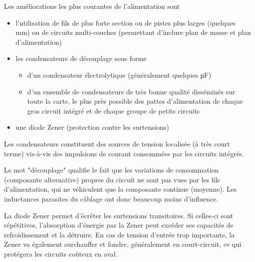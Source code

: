Les améliorations les plus courantes de l'alimentation sont
\begin{itemize}
\item l'utilisation de fils de plus forte section ou de pistes plus larges (quelques \si{\milli\meter}) ou de circuits multi-couches (permettant d'inclure plan de masse et plan d'alimentation)
\item les condensateurs de découplage sous forme
\begin{itemize}
	\item d'un condensateur électrolytique (généralement quelques \si{\micro\farad}) 
	\item d'un ensemble de condensateurs de très bonne qualité disséminés sur toute la carte, le plus près possible des pattes d'alimentation de chaque gros circuit intégré et de chaque groupe de petits circuits

\end{itemize}
\item une diode Zener (protection contre les surtensions)
\end{itemize}
Les condensateurs constituent des sources de tension localisée (à très court terme) vis-à-vis des impulsions de courant consommées par les circuits intégrés.\bigbreak

Le mot "découplage" qualifie le fait que les variations de consommation (composante alternative) propres du circuit ne sont pas vues par les fils d'alimentation, qui ne véhiculent que la composante continue (moyenne). Les inductances parasites du câblage ont donc beaucoup moins d'influence.\bigbreak

La diode Zener permet d'écrêter les surtensions transitoires. Si celles-ci sont répétitives, l'absorption d'énergie par la Zener peut excéder ses capacités de refroidissement et la détruire. En cas de tension d'entrée trop importante, la Zener va également surchauffer et fondre, généralement en court-circuit, ce qui protégera les circuits coûteux en aval.
